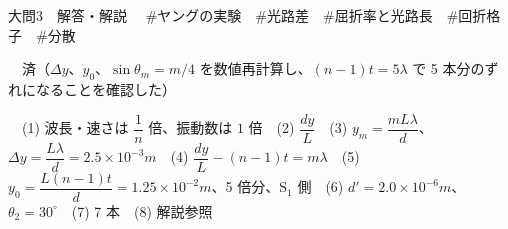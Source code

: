 \documentclass[paper=b5, fontsize=8pt, fleqn, twoside]{jlreq}
\begin{document}
\begin{ascolorbox4A}[75点・30分]{大問3　解答・解説}
　\#ヤングの実験　\#光路差　\#屈折率と光路長　\#回折格子　\#分散\par
{}　済（$\Delta y$、$y_0$、$\sin\theta_m=m/4$ を数値再計算し、$(n-1)t=5\lambda$ で 5 本分のずれになることを確認した）\par
{}　(1) 波長・速さは $\dfrac{1}{n}$ 倍、振動数は $1$ 倍　(2) $\dfrac{dy}{L}$　(3) $y_m=\dfrac{mL\lambda}{d}$、$\Delta y=\dfrac{L\lambda}{d}=2.5\times10^{-3}\unit{m}$　(4) $\dfrac{dy}{L}-(n-1)t=m\lambda$　(5) $y_0=\dfrac{L(n-1)t}{d}=1.25\times10^{-2}\unit{m}$、5 倍分、$\mathrm{S}_1$ 側　(6) $d'=2.0\times10^{-6}\unit{m}$、$\theta_2=30^\circ$　(7) 7 本　(8) 解説参照
\end{ascolorbox4A}
\end{document}
